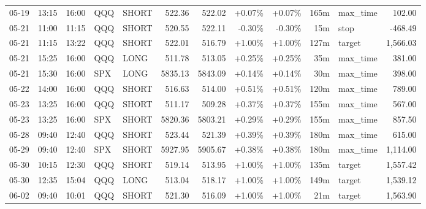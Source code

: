 \documentclass[11pt,a4paper]{article}
\begin{document}
\begin{center}
\begin{longtable}{>{\color{txtmain}}l l l l l r r r r r >{\color{txtmain}}l r}
05-19 & 13:15 & 16:00 & QQQ & SHORT & 522.36 & 522.02 & \textcolor{wingreen}{+0.07\%} & \textcolor{wingreen}{+0.07\%} & 165m & max\_time & \textcolor{wingreen}{102.00} \\
05-21 & 11:00 & 11:15 & QQQ & SHORT & 520.55 & 522.11 & \textcolor{lossred}{-0.30\%} & \textcolor{lossred}{-0.30\%} & 15m & stop & \textcolor{lossred}{-468.49} \\
05-21 & 11:15 & 13:22 & QQQ & SHORT & 522.01 & 516.79 & \textcolor{wingreen}{+1.00\%} & \textcolor{wingreen}{+1.00\%} & 127m & target & \textcolor{wingreen}{1,566.03} \\
05-21 & 15:25 & 16:00 & QQQ & LONG & 511.78 & 513.05 & \textcolor{wingreen}{+0.25\%} & \textcolor{wingreen}{+0.25\%} & 35m & max\_time & \textcolor{wingreen}{381.00} \\
05-21 & 15:30 & 16:00 & SPX & LONG & 5835.13 & 5843.09 & \textcolor{wingreen}{+0.14\%} & \textcolor{wingreen}{+0.14\%} & 30m & max\_time & \textcolor{wingreen}{398.00} \\
05-22 & 14:00 & 16:00 & QQQ & SHORT & 516.63 & 514.00 & \textcolor{wingreen}{+0.51\%} & \textcolor{wingreen}{+0.51\%} & 120m & max\_time & \textcolor{wingreen}{789.00} \\
05-23 & 13:25 & 16:00 & QQQ & SHORT & 511.17 & 509.28 & \textcolor{wingreen}{+0.37\%} & \textcolor{wingreen}{+0.37\%} & 155m & max\_time & \textcolor{wingreen}{567.00} \\
05-23 & 13:25 & 16:00 & SPX & SHORT & 5820.36 & 5803.21 & \textcolor{wingreen}{+0.29\%} & \textcolor{wingreen}{+0.29\%} & 155m & max\_time & \textcolor{wingreen}{857.50} \\
05-28 & 09:40 & 12:40 & QQQ & SHORT & 523.44 & 521.39 & \textcolor{wingreen}{+0.39\%} & \textcolor{wingreen}{+0.39\%} & 180m & max\_time & \textcolor{wingreen}{615.00} \\
05-29 & 09:40 & 12:40 & SPX & SHORT & 5927.95 & 5905.67 & \textcolor{wingreen}{+0.38\%} & \textcolor{wingreen}{+0.38\%} & 180m & max\_time & \textcolor{wingreen}{1,114.00} \\
05-30 & 10:15 & 12:30 & QQQ & SHORT & 519.14 & 513.95 & \textcolor{wingreen}{+1.00\%} & \textcolor{wingreen}{+1.00\%} & 135m & target & \textcolor{wingreen}{1,557.42} \\
05-30 & 12:35 & 15:04 & QQQ & LONG & 513.04 & 518.17 & \textcolor{wingreen}{+1.00\%} & \textcolor{wingreen}{+1.00\%} & 149m & target & \textcolor{wingreen}{1,539.12} \\
06-02 & 09:40 & 10:01 & QQQ & SHORT & 521.30 & 516.09 & \textcolor{wingreen}{+1.00\%} & \textcolor{wingreen}{+1.00\%} & 21m & target & \textcolor{wingreen}{1,563.90} \\

\end{longtable}
\end{center}
\end{document}
